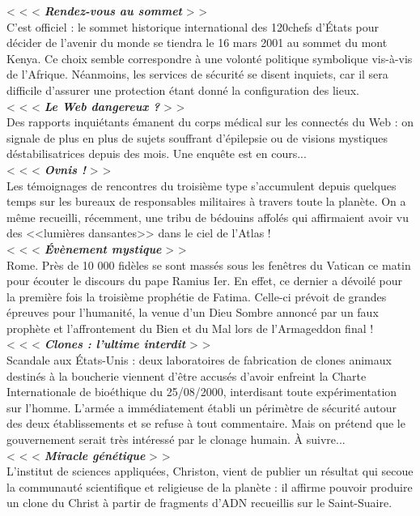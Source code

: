 \documentclass[11pt,twoside,a4paper]{book}
\begin{document}
< < <  \textbf{\textit{Rendez-vous au sommet}} > >~\\
C'est officiel : le sommet historique international des 120chefs d'{\'E}tats pour d{\'e}cider de l'avenir du monde se tiendra le 16 mars 2001 au sommet du mont Kenya. Ce choix semble correspondre {\`a} une volont{\'e} politique symbolique vis-{\`a}-vis de l'Afrique. N{\'e}anmoins, les services de s{\'e}curit{\'e} se disent inquiets, car il sera difficile d'assurer une protection {\'e}tant donn{\'e} la configuration des lieux.~\\
< < <  \textbf{\textit{Le Web dangereux ?}} > >~\\
Des rapports inqui{\'e}tants {\'e}manent du corps m{\'e}dical sur les connect{\'e}s du Web : on signale de plus en plus de sujets souffrant d'{\'e}pilepsie ou de visions mystiques d{\'e}stabilisatrices depuis des mois. Une enqu{\^e}te est en cours...~\\
< < <  \textbf{\textit{Ovnis !}} > >~\\
Les t{\'e}moignages de rencontres du troisi{\`e}me type s'accumulent depuis quelques temps sur les bureaux de responsables militaires {\`a} travers toute la plan{\`e}te. On a m{\^e}me recueilli, r{\'e}cemment, une tribu de b{\'e}douins affol{\'e}s qui affirmaient avoir vu des <<lumi{\`e}res dansantes>> dans le ciel de l'Atlas !~\\
< < <  \textbf{\textit{{\'E}v{\`e}nement mystique}} > >~\\
Rome. Pr{\`e}s de 10 000 fid{\`e}les se sont mass{\'e}s sous les fen{\^e}tres du Vatican ce matin pour {\'e}couter le discours du pape Ramius Ier. En effet, ce dernier a d{\'e}voil{\'e} pour la premi{\`e}re fois la troisi{\`e}me proph{\'e}tie de Fatima. Celle-ci pr{\'e}voit de grandes {\'e}preuves pour l'humanit{\'e}, la venue d'un Dieu Sombre annonc{\'e} par un faux proph{\`e}te et l'affrontement du Bien et du Mal lors de l'Armageddon final !~\\
< < <  \textbf{\textit{Clones : l'ultime interdit}} > >~\\
Scandale aux {\'E}tats-Unis : deux laboratoires de fabrication de clones animaux destin{\'e}s {\`a} la boucherie viennent d'{\^e}tre accus{\'e}s d'avoir enfreint la Charte Internationale de bio{\'e}thique du 25/08/2000, interdisant toute exp{\'e}rimentation sur l'homme. L'arm{\'e}e a imm{\'e}diatement {\'e}tabli un p{\'e}rim{\`e}tre de s{\'e}curit{\'e} autour des deux {\'e}tablissements et se refuse {\`a} tout commentaire. Mais on pr{\'e}tend que le gouvernement serait tr{\`e}s int{\'e}ress{\'e} par le clonage humain. {\`A} suivre...~\\
< < <  \textbf{\textit{Miracle g{\'e}n{\'e}tique}} > >~\\
L'institut de sciences appliqu{\'e}es, Christon, vient de publier un r{\'e}sultat qui secoue la communaut{\'e} scientifique et religieuse de la plan{\`e}te : il affirme pouvoir produire un clone du Christ {\`a} partir de fragments d'ADN recueillis sur le Saint-Suaire.~\\
\end{document}
